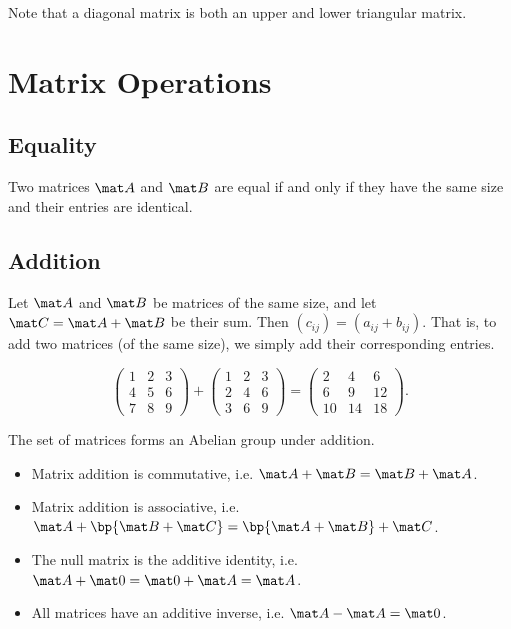 Note that a diagonal matrix is both an upper and lower triangular matrix.

\section{Matrix Operations}

\subsection{Equality}

\begin{definition}
    Two matrices $\mat A$ and $\mat B$ are equal if and only if they have the same size and their entries are identical.
\end{definition}

\subsection{Addition}

\begin{definition}
    Let $\mat A$ and $\mat B$ be matrices of the same size, and let $\mat C = \mat A + \mat B$ be their sum. Then $(c_{ij}) = (a_{ij} + b_{ij})$. That is, to add two matrices (of the same size), we simply add their corresponding entries.
\end{definition}

\begin{example}
    \[\begin{pmatrix}1 & 2 & 3 \\ 4 & 5 & 6 \\ 7 & 8 & 9\end{pmatrix} + \begin{pmatrix}1 & 2 & 3 \\ 2 & 4 & 6 \\ 3 & 6 & 9\end{pmatrix} = \begin{pmatrix}2 & 4 & 6 \\ 6 & 9 & 12 \\ 10 & 14 & 18\end{pmatrix}.\]
\end{example}

\begin{fact}
    The set of matrices forms an Abelian group under addition.
    \begin{itemize}
        \item Matrix addition is commutative, i.e. $\mat A + \mat B = \mat B + \mat A$.
        \item Matrix addition is associative, i.e. $\mat A + \bp{\mat B + \mat C} = \bp{\mat A + \mat B} + \mat C$.
        \item The null matrix is the additive identity, i.e. $\mat A + \mat 0 = \mat 0 + \mat A = \mat A$.
        \item All matrices have an additive inverse, i.e. $\mat A - \mat A = \mat 0$.
    \end{itemize}
\end{fact}

